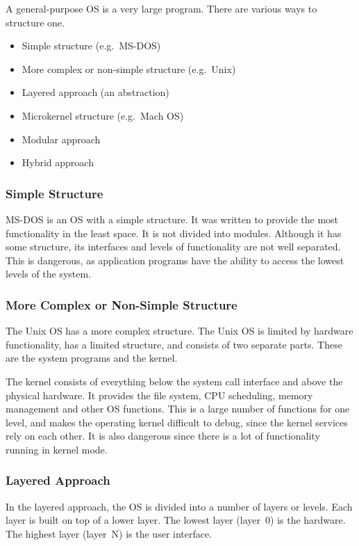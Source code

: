 A general-purpose OS is a very large program.
There are various ways to structure one.
\begin{itemize}
  \item Simple structure (e.g.\ MS-DOS)
  \item More complex or non-simple structure (e.g.\ Unix)
  \item Layered approach (an abstraction)
  \item Microkernel structure (e.g.\ Mach OS)
  \item Modular approach
  \item Hybrid approach
\end{itemize}
{\color{gray}
\subsubsection{Simple Structure}

MS-DOS is an OS with a simple structure.
It was written to provide the most functionality in the least space.
It is not divided into modules.
Although it has some structure, its interfaces and levels of functionality are not well separated.
This is dangerous, as application programs have the ability to access the lowest levels of the system.

\subsubsection{More Complex or Non-Simple Structure}

The Unix OS has a more complex structure.
The Unix OS is limited by hardware functionality, has a limited structure, and consists of two separate parts.
These are the system programs and the kernel.

The kernel consists of everything below the system call interface and above the physical hardware.
It provides the file system, CPU scheduling, memory management and other OS functions.
This is a large number of functions for one level, and makes the operating kernel difficult to debug, since the kernel services rely on each other.
It is also dangerous since there is a lot of functionality running in kernel mode.

\subsubsection{Layered Approach}

In the layered approach, the OS is divided into a number of layers or levels.
Each layer is built on top of a lower layer.
The lowest layer (layer~0) is the hardware.
The highest layer (layer~N) is the user interface.

}

